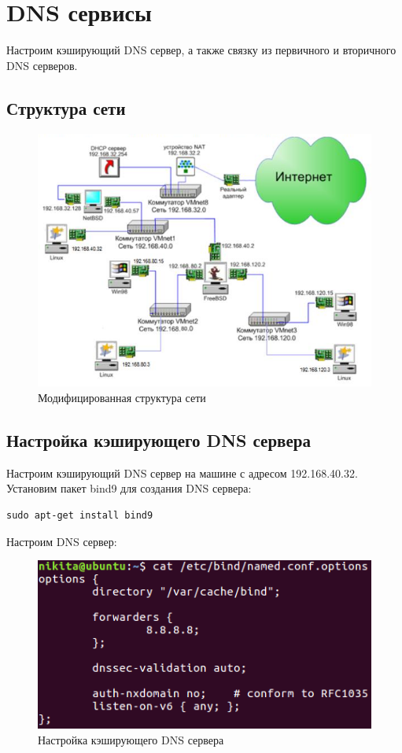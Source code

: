 \documentclass[14pt,a4paper,report]{report}
\begin{document}
\clearpage

\section{DNS сервисы}

Настроим кэширующий DNS сервер, а также связку из первичного и вторичного DNS серверов.

\subsection{Структура сети}

\begin{figure}[h!]
	\centering
	\includegraphics[scale = 0.9]{images/0_1.png}
	\caption{Модифицированная структура сети}
	\label{image:1}
\end{figure}

\subsection{Настройка кэширующего DNS сервера}

Настроим кэширующий DNS сервер на машине с адресом 192.168.40.32. Установим пакет bind9 для создания DNS сервера:

\begin{lstlisting}
sudo apt-get install bind9
\end{lstlisting}

Настроим DNS сервер:

\begin{figure}[h!]
	\centering
	\includegraphics[scale = 1.0]{images/3_1.png}
	\caption{Настройка кэширующего DNS сервера}
	\label{image:13}
\end{figure}
\end{document}
